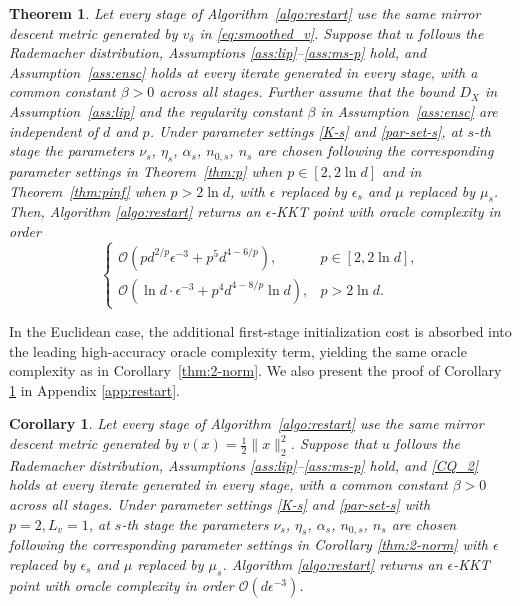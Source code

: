 \documentclass[11pt]{article}
\newtheorem{theorem}{Theorem}[section]
\newtheorem{corollary}{Corollary}[section]
\numberwithin{equation}{section}
\newcommand{\be}{\begin{equation}}
\newcommand{\ee}{\end{equation}}
\begin{document}
\begin{theorem}
\label{thm:restart}
 Let every stage of Algorithm~\ref{algo:restart} use the same mirror descent metric generated by \(v_\delta\) in \eqref{eq:smoothed_v}.  Suppose that \(u\) follows the Rademacher distribution,  Assumptions \ref{ass:lip}--\ref{ass:ms-p} hold, and  Assumption~\ref{ass:ensc} holds at every iterate generated in every stage, with a common constant \(\beta>0\) across all stages. Further assume that the bound $D_X$ in Assumption~\ref{ass:lip} and the regularity constant $\beta$ in Assumption~\ref{ass:ensc} are  independent of \(d\) and \(p\).  Under parameter settings \eqref{K-s} and \eqref{par-set-s},  at $s$-th stage the parameters \(\nu_s\), \(\eta_s\), \(\alpha_s\), \(n_{0,s}\), \(n_s\) are chosen following the corresponding parameter settings in Theorem~\ref{thm:p}  when \(p\in[2,2\ln d]\) and in Theorem~\ref{thm:pinf} when \(p>2\ln d\), with \(\epsilon\) replaced by \(\epsilon_s\) and \(\mu\) replaced by \(\mu_s\).   Then, Algorithm \ref{algo:restart} returns an \(\epsilon\)-KKT point %
with oracle complexity in order
\be\label{mul-cp}
\begin{cases}
\mathcal O(p d^{2/p}\epsilon^{-3}+p^5d^{4-6/p}), & p\in[2,2\ln d],\\[2mm]
\mathcal O(\ln d\cdot\epsilon^{-3}+p^4d^{4-8/p}\ln d), & p>2\ln d.
\end{cases}
\ee
\end{theorem}

In the Euclidean case, the additional first-stage initialization cost is absorbed into the leading {high-accuracy} oracle complexity term, yielding the same oracle complexity as in Corollary~\ref{thm:2-norm}. We also present the proof of Corollary \ref{cor:2-restart}  in Appendix \ref{app:restart}.

\begin{corollary}\label{cor:2-restart}
Let every stage of Algorithm~\ref{algo:restart} use the same mirror descent metric generated by \(v(x) = \frac{1}{2}\|x\|_2^2\). Suppose that \(u\) follows the Rademacher distribution,  Assumptions \ref{ass:lip}--\ref{ass:ms-p} hold, and  \eqref{CQ_2} holds at every iterate generated in every stage, with a common constant \(\beta>0\) across all stages. Under parameter settings \eqref{K-s} and \eqref{par-set-s} with \(p=2, L_v=1\), at $s$-th stage the parameters \(\nu_s\), \(\eta_s\), \(\alpha_s\), \(n_{0,s}\), \(n_s\) are chosen following the corresponding parameter settings in Corollary \ref{thm:2-norm} with \(\epsilon\) replaced by \(\epsilon_s\) and \(\mu\) replaced by \(\mu_s\). Algorithm \ref{algo:restart} returns an \(\epsilon\)-KKT point 
with oracle complexity in order \(\mathcal O(d\epsilon^{-3})\). 
\end{corollary}
\end{document}
